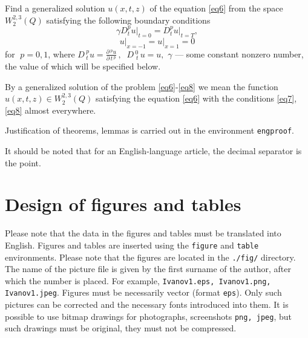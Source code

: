 \documentclass{mfitjournal-en}%
\begin{document}
\begin{engtask}[1]
Find a generalized solution $ u (x, t, z) $ of the equation \eqref{eq6} from the space $ W_ {2} ^ {2,3} (Q) $ satisfying the following boundary conditions
\begin{equation} \label{eq7}
\gamma D_{t}^{p} \left. u\right|_{t=0} =D_{t}^{p} \left. u\right|_{t=T} ,
\end{equation}
\begin{equation}\label{eq8}
\left. u\right|_{x=-1} =\left. u\right|_{x=1} =0
\end{equation}
for $ \; p = 0,1 $, where $ D \, _ {t} ^ {p} u = \frac {\partial \, ^ {p} u} {\partial \, t \, ^ {p}} \, , \; \; D \, _ {\, t} ^ {0} \, u = u, $ $ \gamma $ --- some constant nonzero number, the value of which will be specified below.
\end{engtask}

\begin{engdefinition}[1] By a generalized solution of the problem \eqref{eq6}-\eqref{eq8} we mean the function $ u (x, t, z) \in W_ {2} ^ {2,3} (Q) $ satisfying the equation \eqref{eq6} with the conditions \eqref{eq7}, \eqref{eq8} almost everywhere.
\end{engdefinition}
\begin{engproof}
Justification of theorems, lemmas is carried out in the environment {\tt engproof}.
\end{engproof}

\begin{engremark}[2]
It should be noted that for an English-language article, the decimal separator is the point.	
\end{engremark}

\section*{Design of figures and tables}

Please note that the data in the figures and tables must be translated into English. Figures and tables are inserted using the {\tt figure} and {\tt table} environments. Please note that the figures are located in the {\tt ./fig/} directory. The name of the picture file is given by the first surname of the author, after which the number is placed. For example, {\tt Ivanov1.eps, Ivanov1.png, Ivanov1.jpeg}. Figures must be necessarily vector (format {\tt eps}). Only such pictures can be corrected and the necessary fonts introduced into them. It is possible to use bitmap drawings for photographs, screenshots {\tt png, jpeg}, but such drawings must be original, they must not be compressed.
\end{document}
